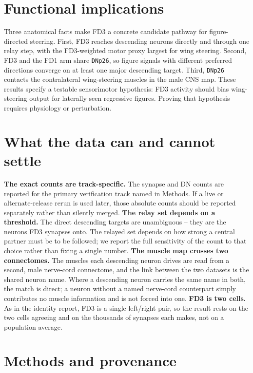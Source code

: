 \documentclass[11pt]{article}
\newcommand{\ttt}[1]{\texttt{#1}}
\begin{document}
\section{Functional implications}

Three anatomical facts make FD3 a concrete candidate pathway for figure-directed steering. First, FD3 reaches descending neurons directly and through one relay step, with the FD3-weighted motor proxy largest for wing steering. Second, FD3 and the FD1 arm share \ttt{DNp26}, so figure signals with different preferred directions converge on at least one major descending target. Third, \ttt{DNp26} contacts the contralateral wing-steering muscles in the male CNS map. These results specify a testable sensorimotor hypothesis: FD3 activity should bias wing-steering output for laterally seen regressive figures. Proving that hypothesis requires physiology or perturbation.

\section{What the data can and cannot settle}

\textbf{The exact counts are track-specific.} The synapse and DN counts are reported for the primary verification track named in Methods. If a live or alternate-release rerun is used later, those absolute counts should be reported separately rather than silently merged. \textbf{The relay set depends on a threshold.} The direct descending targets are unambiguous -- they are the neurons FD3 synapses onto. The relayed set depends on how strong a central partner must be to be followed; we report the full sensitivity of the count to that choice rather than fixing a single number. \textbf{The muscle map crosses two connectomes.} The muscles each descending neuron drives are read from a second, male nerve-cord connectome, and the link between the two datasets is the shared neuron name. Where a descending neuron carries the same name in both, the match is direct; a neuron without a named nerve-cord counterpart simply contributes no muscle information and is not forced into one. \textbf{FD3 is two cells.} As in the identity report, FD3 is a single left/right pair, so the result rests on the two cells agreeing and on the thousands of synapses each makes, not on a population average.

\section{Methods and provenance}
\end{document}
